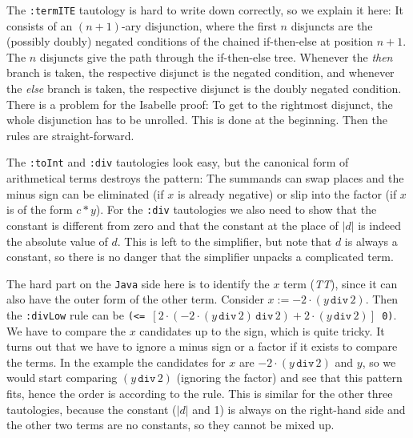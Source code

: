 \documentclass[10pt,a4paper]{article}
\newcommand{\jav}{\texttt{Java}\xspace}
\newcommand{\ttt}{\texttt}
\newcommand{\TTx}{\emph{TT}}
\newcommand{\TT}{\TTx\xspace}
\newcommand{\smtdiv}[2]{\ensuremath{#1 \, \texttt{div} \, #2}}
\newcommand{\cs}[1]{\ensuremath{[#1]}}
\begin{document}
\smallskip

The \ttt{:termITE} tautology is hard to write down correctly, so we explain it here: It consists of an $(n + 1)$-ary disjunction, where the first $n$ disjuncts are the (possibly doubly) negated conditions of the chained if-then-else at position $n+1$. The $n$ disjuncts give the path through the if-then-else tree. Whenever the \emph{then} branch is taken, the respective disjunct is the negated condition, and whenever the \emph{else} branch is taken, the respective disjunct is the doubly negated condition. There is a problem for the Isabelle proof: To get to the rightmost disjunct, the whole disjunction has to be unrolled. This is done at the beginning. Then the rules are straight-forward.

\smallskip

The \ttt{:toInt} and \ttt{:div} tautologies look easy, but the canonical form of arithmetical terms destroys the pattern: The summands can swap places and the minus sign can be eliminated (if $x$ is already negative) or slip into the factor (if $x$ is of the form $c * y$). For the \ttt{:div} tautologies we also need to show that the constant is different from zero and that the constant at the place of $|d|$ is indeed the absolute value of $d$. This is left to the simplifier, but note that $d$ is always a constant, so there is no danger that the simplifier unpacks a complicated term.

The hard part on the \jav side here is to identify the $x$ term (\TT), since it can also have the outer form of the other term. Consider $x := -2 \cdot (\smtdiv{y}{2})$. Then the \ttt{:divLow} rule can be \mbox{\ttt{(<= \cs{2 \cdot (\smtdiv{-2 \cdot (\smtdiv{y}{2})}{2}) + 2 \cdot (\smtdiv{y}{2})} 0)}}. We have to compare the $x$ candidates up to the sign, which is quite tricky. It turns out that we have to ignore a minus sign or a factor if it exists to compare the terms. In the example the candidates for $x$ are $-2 \cdot (\smtdiv{y}{2})$ and $y$, so we would start comparing $(\smtdiv{y}{2})$ (ignoring the factor) and see that this pattern fits, hence the order is according to the rule. This is similar for the other three tautologies, because the constant ($|d|$ and 1) is always on the right-hand side and the other two terms are no constants, so they cannot be mixed up.
%
\end{document}
